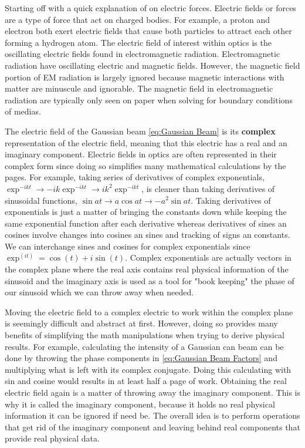 \documentclass[11pt,a4paper]{book}
\begin{document}
		Starting off with a quick explanation of on electric forces. Electric fields or forces are a type of force that act on charged bodies. For example, a proton and electron both exert electric fields that cause both particles to attract each other forming a hydrogen atom. The electric field of interest within optics is the oscillating electric fields found in electromagnetic radiation. Electromagnetic radiation have oscillating electric and magnetic fields. However, the magnetic field portion of EM radiation is largely ignored because magnetic interactions with matter are minuscule and ignorable. The magnetic field in electromagnetic radiation are typically only seen on paper when solving for boundary conditions of medias.  
		
		The electric field of the Gaussian beam \autoref{eq:Gaussian Beam} is its \textbf{complex} representation of the electric field, meaning that this electric has a real and an imaginary component. Electric fields in optics are often represented in their complex form since doing so simplifies many mathematical calculations by the pages. For example, taking series of derivatives of complex exponentials, $\exp^{-ikt} \rightarrow -ik\exp^{-ikt} \rightarrow {ik}^2 \exp^{-ikt}$, is  cleaner than taking derivatives of sinusoidal functions, $\sin{at} \rightarrow a\cos{at} \rightarrow -a^2\sin{at}$. Taking derivatives of exponentials is just a matter of bringing the constants down while keeping the same exponential function after each derivative whereas derivatives of sines an cosines involve changes into cosines an sines and tracking of signs an constants. We can interchange sines and cosines for complex exponentials since $\exp^{(it)}=\cos(t)+i \sin(t)$. Complex exponentials are actually vectors in the complex plane where the real axis contains real physical information of the sinusoid and the imaginary axis is used as a tool for "book keeping" the phase of our sinusoid which we can throw away when needed.
		
		Moving the electric field to a complex electric to work within the complex plane is seemingly difficult and abstract at first. However, doing so provides many benefits of simplifying the math manipulations when trying to derive physical results. For example, calculating the intensity of a Gaussian can beam can be done by throwing the phase components in \autoref{eq:Gaussian Beam Factors} and multiplying what is left with its complex conjugate. Doing this calculating with sin and cosine would results in at least half a page of work. Obtaining the real electric field again is a matter of throwing away the imaginary component. This is why it is called the imaginary component, because it holds no real physical information it can be ignored if need be. The overall idea is to perform operations that get rid of the imaginary component and leaving behind real components that provide real physical data.
		
\end{document}
